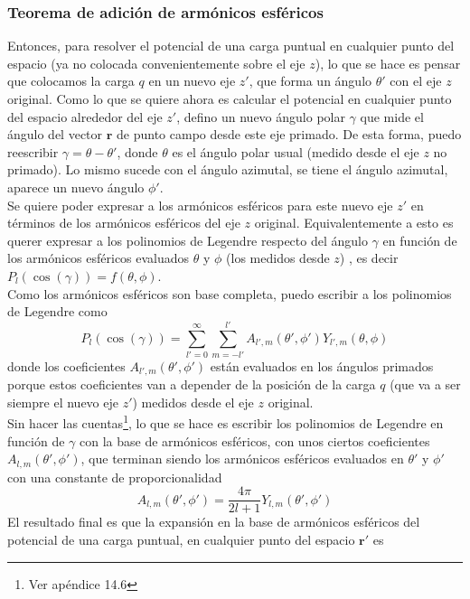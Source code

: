 \subsubsection{Teorema de adición de armónicos esféricos}
Entonces, para resolver el potencial de una carga puntual en cualquier punto del espacio (ya no colocada convenientemente sobre el eje $z$), lo que se hace es pensar que colocamos la carga $q$ en un nuevo eje $z'$, que forma un ángulo $\theta'$ con el eje $z$ original. Como lo que se quiere ahora es calcular el potencial en cualquier punto del espacio alrededor del eje $z'$, defino un nuevo ángulo polar $\gamma$ que mide el ángulo del vector $\textbf{r}$ de punto campo desde este eje primado. De esta forma, puedo reescribir $\gamma = \theta - \theta'$, donde $\theta$ es el ángulo polar usual (medido desde el eje $z$ no primado). Lo mismo sucede con el ángulo azimutal, se tiene el ángulo azimutal, aparece un nuevo ángulo $\phi'$.\\
\indent Se quiere poder expresar a los armónicos esféricos para este nuevo eje $z'$ en términos de los armónicos esféricos del eje $z$ original. Equivalentemente a esto es querer expresar a los polinomios de Legendre respecto del ángulo $\gamma$ en función de los armónicos esféricos evaluados $\theta$ y $\phi$ (los medidos desde $z$) , es decir $P_{l}{(\cos{(\gamma)})} = f(\theta, \phi)$.\\
\indent Como los armónicos esféricos son base completa, puedo escribir a los polinomios de Legendre como
\begin{equation*}
    P_{l}{(\cos{(\gamma)})}=
    \sum\limits_{l' = 0}^{\infty}\sum\limits_{m = -l'}^{l'}
    A_{l',m}(\theta',\phi')Y_{l',m}(\theta,\phi)
\end{equation*}
donde los coeficientes $A_{l',m}(\theta',\phi')$ están evaluados en los ángulos primados porque estos coeficientes van a depender de la posición de la carga $q$ (que va a ser siempre el nuevo eje $z'$) medidos desde el eje $z$ original.\\
\indent Sin hacer las cuentas\footnote{Ver apéndice 14.6}, lo que se hace es escribir los polinomios de Legendre en función de $\gamma$ con la base de armónicos esféricos, con unos ciertos coeficientes $A_{l,m}(\theta',\phi')$, que terminan siendo los armónicos esféricos evaluados en $\theta'$ y $\phi'$ con una constante de proporcionalidad
\begin{equation*}
    A_{l,m}(\theta',\phi') = \frac{4\pi}{2l + 1}Y_{l,m}(\theta',\phi')
\end{equation*}
\indent El resultado final es que la expansión en la base de armónicos esféricos del potencial de una carga puntual, en cualquier punto del espacio $\textbf{r}'$ es

